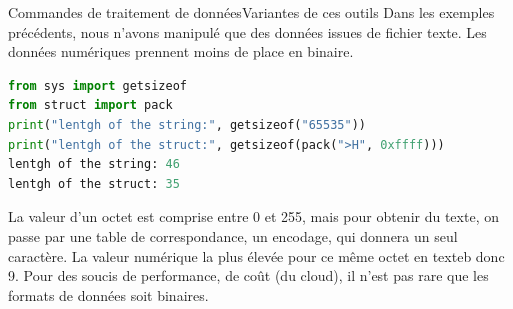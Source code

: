 \documentclass{beamer}
\begin{document}
    \begin{frame}[fragile]{Commandes de traitement de données}{Variantes de ces outils}
        Dans les exemples précédents, nous n'avons manipulé que des données issues de fichier texte.
        Les données numériques prennent moins de place en binaire.
        \begin{lstlisting}[language=python]
from sys import getsizeof
from struct import pack
print("lentgh of the string:", getsizeof("65535"))
print("lentgh of the struct:", getsizeof(pack(">H", 0xffff)))
lentgh of the string: 46
lentgh of the struct: 35
        \end{lstlisting}
        La valeur d'un octet est comprise entre 0 et 255, mais pour obtenir du texte, on passe par une table de correspondance, un encodage, qui donnera un seul caractère.
        La valeur numérique la plus élevée pour ce même octet en texteb donc 9.
        \bigbreak
        Pour des soucis de performance, de coût (du cloud), il n'est pas rare que les formats de données soit binaires.
    \end{frame}
\end{document}
